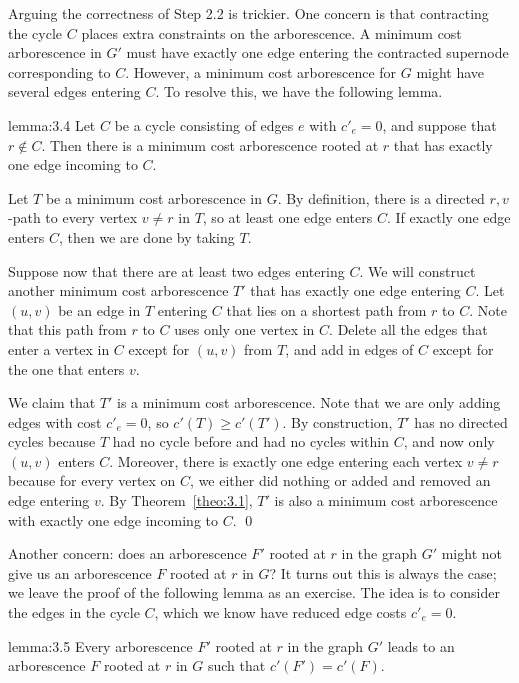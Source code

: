 Arguing the correctness of Step 2.2 is trickier. One concern is that 
contracting the cycle $C$ places extra constraints on the 
arborescence. A minimum cost arborescence in $G'$ must have exactly 
one edge entering the contracted supernode corresponding to $C$. 
However, a minimum cost arborescence for $G$ might have several edges 
entering $C$. To resolve this, we have the following lemma. 

\begin{lemma}{lemma:3.4}
    Let $C$ be a cycle consisting of edges $e$ with $c'_e = 0$, and 
    suppose that $r \notin C$. Then there is a minimum cost arborescence 
    rooted at $r$ that has exactly one edge incoming to $C$.
\end{lemma}\vspace{-0.15cm}
\begin{pf}
    Let $T$ be a minimum cost arborescence in $G$. By definition, there is a 
    directed $r,v$-path to every vertex $v \neq r$ in $T$, so at least one 
    edge enters $C$. If exactly one edge enters $C$, then we are done by taking $T$. 

    Suppose now that there are at least two edges entering $C$. We will 
    construct another minimum cost arborescence $T'$ that has exactly 
    one edge entering $C$. Let $(u, v)$ be an edge in $T$ entering $C$ 
    that lies on a shortest path from $r$ to $C$. Note that this path from 
    $r$ to $C$ uses only one vertex in $C$. Delete all the edges that 
    enter a vertex in $C$ except for $(u, v)$ from $T$, and add in 
    edges of $C$ except for the one that enters $v$. 

    We claim that $T'$ is a minimum cost arborescence. Note that we are 
    only adding edges with cost $c'_e = 0$, so $c'(T) \geq c'(T')$. 
    By construction, $T'$ has no directed cycles because $T$ had no cycle 
    before and had no cycles within $C$, and now only $(u, v)$ enters $C$. 
    Moreover, there is exactly one edge entering each vertex $v \neq r$ 
    because for every vertex on $C$, we either did nothing or added 
    and removed an edge entering $v$. By Theorem~\ref{theo:3.1}, $T'$ is 
    also a minimum cost arborescence with exactly one edge incoming to $C$. \qed
\end{pf}\vspace{-0.25cm}

Another concern: does an arborescence $F'$ rooted at $r$ in the graph 
$G'$ might not give us an arborescence $F$ rooted at $r$ in $G$? It turns 
out this is always the case; we leave the proof of the following lemma 
as an exercise. The idea is to consider the edges in the cycle $C$, which 
we know have reduced edge costs $c'_e = 0$. 

\begin{lemma}{lemma:3.5}
    Every arborescence $F'$ rooted at $r$ in the graph $G'$ leads to 
    an arborescence $F$ rooted at $r$ in $G$ such that $c'(F') = c'(F)$. 
\end{lemma}\vspace{-0.15cm}
